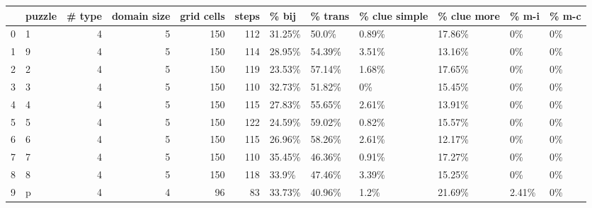 \begin{tabular}{llrrrrllllll}
\toprule
{} & puzzle &  \# type &  domain size &  grid cells &  steps &   \% bij & \% trans & \% clue simple & \% clue more &  \% m-i & \% m-c \\
\midrule
0 &      1 &       4 &            5 &         150 &    112 &  31.25\% &   50.0\% &         0.89\% &      17.86\% &     0\% &    0\% \\
1 &      9 &       4 &            5 &         150 &    114 &  28.95\% &  54.39\% &         3.51\% &      13.16\% &     0\% &    0\% \\
2 &      2 &       4 &            5 &         150 &    119 &  23.53\% &  57.14\% &         1.68\% &      17.65\% &     0\% &    0\% \\
3 &      3 &       4 &            5 &         150 &    110 &  32.73\% &  51.82\% &            0\% &      15.45\% &     0\% &    0\% \\
4 &      4 &       4 &            5 &         150 &    115 &  27.83\% &  55.65\% &         2.61\% &      13.91\% &     0\% &    0\% \\
5 &      5 &       4 &            5 &         150 &    122 &  24.59\% &  59.02\% &         0.82\% &      15.57\% &     0\% &    0\% \\
6 &      6 &       4 &            5 &         150 &    115 &  26.96\% &  58.26\% &         2.61\% &      12.17\% &     0\% &    0\% \\
7 &      7 &       4 &            5 &         150 &    110 &  35.45\% &  46.36\% &         0.91\% &      17.27\% &     0\% &    0\% \\
8 &      8 &       4 &            5 &         150 &    118 &   33.9\% &  47.46\% &         3.39\% &      15.25\% &     0\% &    0\% \\
9 &      p &       4 &            4 &          96 &     83 &  33.73\% &  40.96\% &          1.2\% &      21.69\% &  2.41\% &    0\% \\
\bottomrule
\end{tabular}
